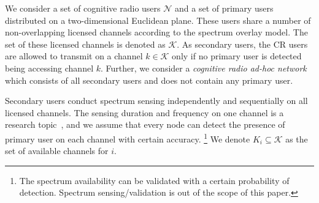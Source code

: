 \documentclass[10pt,journal,compsoc]{IEEEtran}
\theoremstyle{mytheoremstyle}
\theoremstyle{mytheoremstyle}
\theoremstyle{mytheoremstyle}
\begin{document}
We consider a set of cognitive radio users $\mathcal{N}$ and a set of primary users distributed on a two-dimensional Euclidean plane.
These users share a number of non-overlapping licensed channels according to the spectrum overlay model. 
The set of these licensed channels is denoted as $\mathcal{K}$. 
As secondary users, the CR users are allowed to transmit on a channel $k \in \mathcal{K}$ only if no primary user is detected being accessing channel $k$. 
Further, we consider a \textit{cognitive radio ad-hoc network} which consists of all secondary users and does not contain any primary user.


Secondary users conduct spectrum sensing independently and sequentially on all licensed channels.
The sensing duration and frequency on one channel is a research topic~\cite{sensing_survey_2009}, and we assume that every node can detect the presence of primary user on each channel with certain accuracy. \footnote{The spectrum availability can be validated with a certain probability of detection. Spectrum sensing/validation is out of the scope of this paper.}
We denote $K_i \subseteq \mathcal{K}$ as the set of available channels for $i$.

\end{document}
